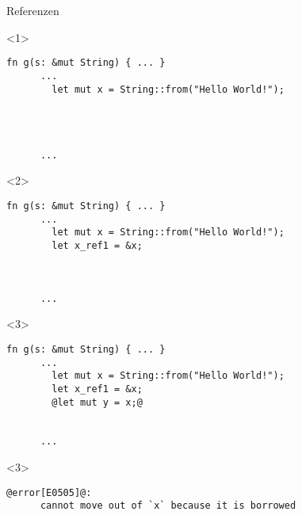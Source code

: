 

\lstset{showstringspaces=true,columns=fullflexible,keepspaces=true}

\begin{frame}[fragile]{Referenzen}


  \begin{onlyenv}<1> {
    \begin{lstlisting}[frame=single,style=base]
      fn g(s: &mut String) { ... }
      ...
        let mut x = String::from("Hello World!");




      ...\end{lstlisting}
  }
  \end{onlyenv}


  \begin{onlyenv}<2> {
    \begin{lstlisting}[frame=single,style=base]
      fn g(s: &mut String) { ... }
      ...
        let mut x = String::from("Hello World!");
        let x_ref1 = &x;



      ...\end{lstlisting}
  }
  \end{onlyenv}


  \begin{onlyenv}<3> {
    \begin{lstlisting}[frame=single,style=base]
      fn g(s: &mut String) { ... }
      ...
        let mut x = String::from("Hello World!");
        let x_ref1 = &x;
        @let mut y = x;@


      ...\end{lstlisting}
  }
  \end{onlyenv}

  \begin{onlyenv}<3> {
    \begin{lstlisting}[frame=single,style=base]
      @error[E0505]@:
      cannot move out of `x` because it is borrowed\end{lstlisting}
  }
  \end{onlyenv}


\end{frame}
